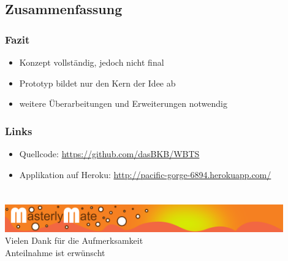 \documentclass[xcolor=dvipsnames, utf8]{beamer}
\begin{document}
\subsection{Zusammenfassung}

\begin{frame}
\frametitle{Fazit}
\begin{itemize}
  \item Konzept vollständig, jedoch nicht final
  \item Prototyp bildet nur den Kern der Idee ab
  \item weitere Überarbeitungen und Erweiterungen notwendig
\end{itemize}
\end{frame}

\begin{frame}
\frametitle{Links}
\begin{itemize}
  \item Quellcode: \url{https://github.com/dasBKB/WBTS}
  \item Applikation auf Heroku: \url{http://pacific-gorge-6894.herokuapp.com/}
\end{itemize}
\end{frame}

\section*{}
\begin{frame}
\centering
\includegraphics[width=0.9\textwidth]{mm_header.png}\\
\Huge{Vielen Dank für die Aufmerksamkeit}\\
\Large{Anteilnahme ist erwünscht}
\end{frame}
\end{document}
